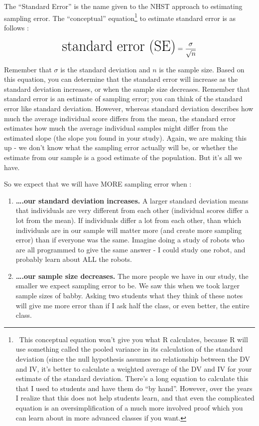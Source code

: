 \documentclass[
  letterpaper,
  DIV=11,
  numbers=noendperiod,
  oneside]{scrreprt}
\begin{document}
The ``Standard Error'' is the name given to the NHST approach to
estimating sampling error. The ``conceptual'' equation\footnote{~This
  conceptual equation won't give you what R calculates, because R will
  use something called the pooled variance in its calculation of the
  standard deviation (since the null hypothesis assumes no relationship
  between the DV and IV, it's better to calculate a weighted average of
  the DV and IV for your estimate of the standard deviation. There's a
  long equation to calculate this that I used to students and have them
  do ``by hand''. However, over the years I realize that this does not
  help students learn, and that even the complicated equation is an
  oversimplification of a much more involved proof which you can learn
  about in more advanced classes if you want.} to estimate standard
error is as follows :

\[
\huge \text{standard error (SE)} = \frac{\sigma}{\sqrt{n}}
\]

Remember that \(\sigma\) is the standard deviation and \(n\) is the
sample size. Based on this equation, you can determine that the standard
error will increase as the standard deviation increases, or when the
sample size decreases. Remember that standard error is an estimate of
sampling error; you can think of the standard error like standard
deviation. However, whereas standard deviation describes how much the
average individual score differs from the mean, the standard error
estimates how much the average individual samples might differ from the
estimated slope (the slope you found in your study). Again, we are
making this up - we don't know what the sampling error actually will be,
or whether the estimate from our sample is a good estimate of the
population. But it's all we have.

So we expect that we will have MORE sampling error when :~

\begin{enumerate}
\def\labelenumi{\arabic{enumi}.}
\item
  \textbf{\ldots.our standard deviation increases.} A larger standard
  deviation means that individuals are very different from each other
  (individual scores differ a lot from the mean). If individuals differ
  a lot from each other, than which individuals are in our sample will
  matter more (and create more sampling error) than if everyone was the
  same. Imagine doing a study of robots who are all programmed to give
  the same answer - I could study one robot, and probably learn about
  ALL the robots.
\item
  \textbf{\ldots.our sample size decreases.} The more people we have in
  our study, the smaller we expect sampling error to be. We saw this
  when we took larger sample sizes of babby. Asking two students what
  they think of these notes will give me more error than if I ask half
  the class, or even better, the entire class.
\end{enumerate}
\end{document}
